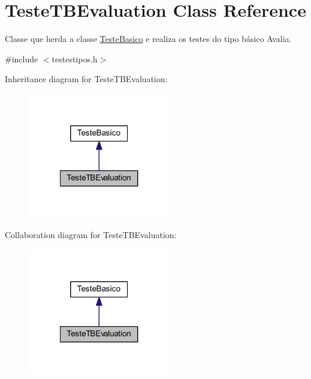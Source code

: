 \hypertarget{class_teste_t_b_evaluation}{\section{Teste\-T\-B\-Evaluation Class Reference}
\label{class_teste_t_b_evaluation}
}


Classe que herda a classe \hyperlink{class_teste_basico}{Teste\-Basico} e realiza os testes do tipo básico Avalia.  




{\ttfamily \#include $<$testestipos.\-h$>$}



Inheritance diagram for Teste\-T\-B\-Evaluation\-:\nopagebreak
\begin{figure}[H]
\begin{center}
\leavevmode
\includegraphics[width=176pt]{class_teste_t_b_evaluation__inherit__graph}
\end{center}
\end{figure}


Collaboration diagram for Teste\-T\-B\-Evaluation\-:\nopagebreak
\begin{figure}[H]
\begin{center}
\leavevmode
\includegraphics[width=176pt]{class_teste_t_b_evaluation__coll__graph}
\end{center}
\end{figure}
